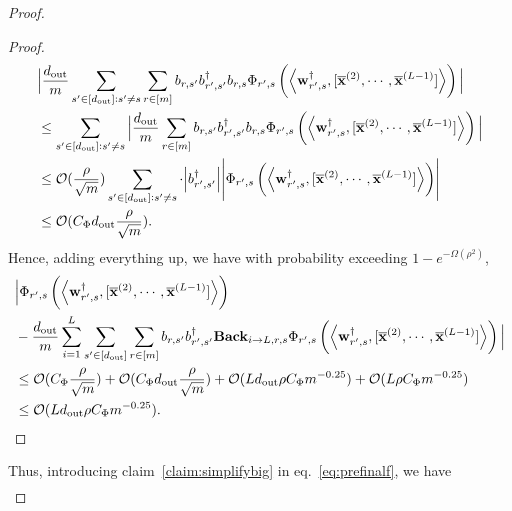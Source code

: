 \begin{claim}
\begin{proof}
\begin{proof}
				\begin{align*}
					&\Big|  \frac{d_{\mathrm{out}} }{m} \sum_{s'\in [d_{\mathrm{out}} ]: s' \ne s} \sum_{r \in [m]}  b_{r, s'} b_{r', s'}^{\dagger} b_{r, s} \Phi_{r', s} \left(\left\langle \mathbf{w}_{r', s}^{\dagger}, [\overline{\mathbf{x}}^{(2)}, \cdots, \overline{\mathbf{x}}^{(L-1)}]\right\rangle\right) \Big| \\&
					\le  \sum_{s'\in [d_{\mathrm{out}} ]: s' \ne s} \Big|  \frac{d_{\mathrm{out}} }{m} \sum_{r \in [m]}  b_{r, s'} b_{r', s'}^{\dagger} b_{r, s} \Phi_{r', s} \left(\left\langle \mathbf{w}_{r', s}^{\dagger}, [\overline{\mathbf{x}}^{(2)}, \cdots, \overline{\mathbf{x}}^{(L-1)}]\right\rangle\right) \Big|\\&
					\le \mathcal{O}(\frac{\rho}{\sqrt{m}})  \sum_{s'\in [d_{\mathrm{out}} ]: s' \ne s} \cdot \abs{b_{r', s'}^{\dagger}} \abs{\Phi_{r', s} \left(\left\langle \mathbf{w}_{r', s}^{\dagger}, [\overline{\mathbf{x}}^{(2)}, \cdots, \overline{\mathbf{x}}^{(L-1)}]\right\rangle\right)}\\&
					\le \mathcal{O}(C_{\Phi} d_{\mathrm{out}}  \frac{\rho}{\sqrt{m}}).
				\end{align*}
				Hence, adding everything up, we have with probability exceeding $1 - e^{-\Omega(\rho^2)}$,
				\begin{align*}
					&\Big| \Phi_{r', s} \left(\left\langle \mathbf{w}_{r', s}^{\dagger}, [\overline{\mathbf{x}}^{(2)}, \cdots, \overline{\mathbf{x}}^{(L-1)}]\right\rangle\right)  \\&- \frac{d_{\mathrm{out}} }{m} \sum_{i=1}^{L}  \sum_{s' \in [d_{\mathrm{out}} ]}  \sum_{r \in [m]}  b_{r, s'} b_{r', s'}^{\dagger} \mathbf{Back}_{i \to L, r, s} \Phi_{r', s} \left(\left\langle \mathbf{w}_{r', s}^{\dagger}, [\overline{\mathbf{x}}^{(2)}, \cdots, \overline{\mathbf{x}}^{(L-1)}]\right\rangle\right) \Big| \\&
					\le  \mathcal{O}(C_{\Phi}\frac{\rho}{\sqrt{m}}) + \mathcal{O}(C_{\Phi} d_{\mathrm{out}}  \frac{\rho}{\sqrt{m}}) + \mathcal{O}(Ld_{\mathrm{out}} \rho C_{\Phi} m^{-0.25}) +  \mathcal{O}(L \rho C_{\Phi} m^{-0.25})  \\&
					\le \mathcal{O}(Ld_{\mathrm{out}}  \rho C_{\Phi} m^{-0.25}).
				\end{align*}
			\end{proof}
			Thus, introducing claim~\ref{claim:simplifybig} in eq.~\ref{eq:prefinalf}, we have
			\begingroup \allowdisplaybreaks
			\begin{align*}

\end{align*}
\end{proof}
\end{claim}
